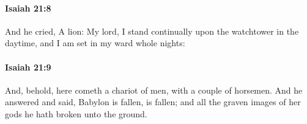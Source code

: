 		\paragraph{Isaiah 21:8} %
			\label{ISAIAH-21-8}

			And he cried, A lion: My lord, I stand continually upon the watchtower in the daytime, and I am set in my ward whole nights:


		\paragraph{Isaiah 21:9} %
			\label{ISAIAH-21-9}

			And, behold, here cometh a chariot of men, with a couple of horsemen. And he answered and said, Babylon is fallen, is fallen; and all the graven images of her gods he hath broken unto the ground.


